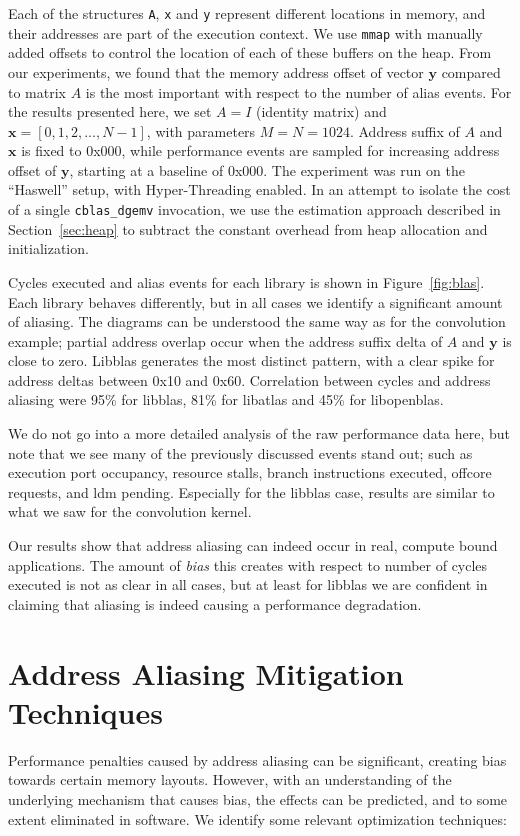 \documentclass[10pt, conference, compsocconf]{IEEEtran}
\begin{document}
Each of the structures \texttt{A}, \texttt{x} and \texttt{y} represent different locations in memory, and their addresses are part of the execution context.
We use \texttt{mmap} with manually added offsets to control the location of each of these buffers on the heap.
From our experiments, we found that the memory address offset of vector $\boldsymbol{y}$ compared to matrix $A$ is the most important with respect to the number of alias events.
For the results presented here, we set $A = I$ (identity matrix) and $\boldsymbol{x} = [0, 1, 2, ..., N-1]$, with parameters $M = N = 1024$.
Address suffix of $A$ and $\boldsymbol{x}$ is fixed to 0x000, while performance events are sampled for increasing address offset of $\boldsymbol{y}$, starting at a baseline of 0x000.
The experiment was run on the ``Haswell'' setup, with Hyper-Threading enabled.
In an attempt to isolate the cost of a single \texttt{cblas_dgemv} invocation, we use the estimation approach described in Section~\ref{sec:heap} to subtract the constant overhead from heap allocation and initialization.

Cycles executed and alias events for each library is shown in Figure~\ref{fig:blas}.
Each library behaves differently, but in all cases we identify a significant amount of aliasing. 
The diagrams can be understood the same way as for the convolution example; partial address overlap occur when the address suffix delta of $A$ and $\boldsymbol{y}$ is close to zero.
Libblas generates the most distinct pattern, with a clear spike for address deltas between 0x10 and 0x60.
Correlation between cycles and address aliasing were 95\% for libblas, 81\% for libatlas and 45\% for libopenblas.

We do not go into a more detailed analysis of the raw performance data here, but note that we see many of the previously discussed events stand out; such as execution port occupancy, resource stalls, branch instructions executed, offcore requests, and ldm pending.
Especially for the libblas case, results are similar to what we saw for the convolution kernel.

Our results show that address aliasing can indeed occur in real, compute bound applications.
The amount of \emph{bias} this creates with respect to number of cycles executed is not as clear in all cases, but at least for libblas we are confident in claiming that aliasing is indeed causing a performance degradation.


\section{Address Aliasing Mitigation Techniques}
\label{sec:mitigation}
Performance penalties caused by address aliasing can be significant, creating bias towards certain memory layouts.
However, with an understanding of the underlying mechanism that causes bias, the effects can be predicted, and to some extent eliminated in software.
We identify some relevant optimization techniques:
\end{document}
